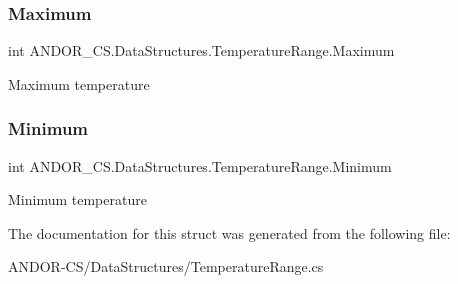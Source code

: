 \subsubsection{\texorpdfstring{Maximum}{Maximum}}
{\footnotesize\ttfamily int A\+N\+D\+O\+R\+\_\+\+C\+S.\+Data\+Structures.\+Temperature\+Range.\+Maximum\hspace{0.3cm}{\ttfamily [get]}}



Maximum temperature 

\mbox{\label{struct_a_n_d_o_r___c_s_1_1_data_structures_1_1_temperature_range_aa3e25e211ab07c4092abed4d81f949c4}} 
\subsubsection{\texorpdfstring{Minimum}{Minimum}}
{\footnotesize\ttfamily int A\+N\+D\+O\+R\+\_\+\+C\+S.\+Data\+Structures.\+Temperature\+Range.\+Minimum\hspace{0.3cm}{\ttfamily [get]}}



Minimum temperature 



The documentation for this struct was generated from the following file\+:\begin{DoxyCompactItemize}
\item 
A\+N\+D\+O\+R-\/\+C\+S/\+Data\+Structures/Temperature\+Range.\+cs\end{DoxyCompactItemize}
